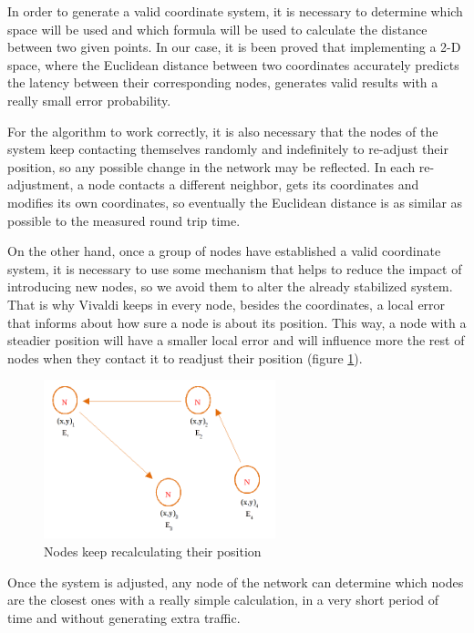 In order to generate a valid coordinate system, it is necessary to determine
which space will be used and which formula will be used to calculate the
distance between two given points. In our case, it is been proved that
implementing a 2-D space, where the Euclidean distance between two coordinates
accurately predicts the latency between their corresponding nodes, generates
valid results with a really small error probability.

For the algorithm to work correctly, it is also necessary that the nodes of the
system keep contacting themselves randomly and indefinitely to re-adjust their
position, so any possible change in the network may be reflected. In each
re-adjustment, a node contacts a different neighbor, gets its coordinates and
modifies its own coordinates, so eventually the Euclidean distance is as similar
as possible to the measured round trip time.

On the other hand, once a group of nodes have established a valid coordinate
system, it is necessary to use some mechanism that helps to reduce the impact of
introducing new nodes, so we avoid them to alter the already stabilized system.
That is why Vivaldi keeps in every node, besides the coordinates, a local error
that informs about how sure a node is about its position. This way, a node with
a steadier position will have a smaller local error and will influence more the
rest of nodes when they contact it to readjust their position (figure
\ref{rms1}).

\begin{figure}[t]
\begin{center}
\includegraphics[width=0.60\textwidth]{images/rms1.png}
\caption{Nodes keep recalculating their position}
\label{rms1}
\end{center}
\end{figure}

Once the system is adjusted, any node of the network can determine which nodes
are the closest ones with a really simple calculation, in a very short period of
time and without generating extra traffic.

